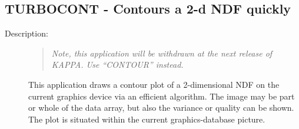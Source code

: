 \documentclass[twoside,11pt]{article}
\newcommand{\stardocinitials}  {SUN}
\newcommand{\stardocnumber}    {239.2}
\newcommand{\stardocname}{\stardocinitials /\stardocnumber}
\newcommand{\xlabel}[1]{}
\newlength{\sstbannerlength}
\newlength{\sstcaptionlength}
\newlength{\sstexampleslength}
\newlength{\sstexampleswidth}
\newcommand{\sstroutine}[3]{
   \goodbreak
   \markboth{{\stardocname}~ --- #1}{{\stardocname}~ --- #1}
   \rule{\textwidth}{0.5mm}
   \vspace{-7ex}
   \newline
   \settowidth{\sstbannerlength}{{\Large {\bf #1}}}
   \setlength{\sstcaptionlength}{\textwidth}
   \setlength{\sstexampleslength}{\textwidth}
   \addtolength{\sstbannerlength}{0.5em}
   \addtolength{\sstcaptionlength}{-2.0\sstbannerlength}
   \addtolength{\sstcaptionlength}{-4.9pt}
   \settowidth{\sstexampleswidth}{{\bf Examples:}}
   \addtolength{\sstexampleslength}{-\sstexampleswidth}
   \parbox[t]{\sstbannerlength}{\flushleft{\Large {\bf #1}}}
   \parbox[t]{\sstcaptionlength}{\center{\Large #2}}
   \parbox[t]{\sstbannerlength}{\flushright{\Large {\bf #1}}}
   \begin{description}
      #3
   \end{description}
}
\newcommand{\sstdescription}[1]{\item[Description:] #1}
\renewcommand{\sstroutine}[3]{
      \subsection{#1\xlabel{#1}-\label{#1}#2}
      \begin{description}
         #3
      \end{description}
   }
\renewcommand{\sstdescription}[1]{\item[Description:]
      \begin{description}
         #1
      \end{description}
   }
\begin{document}
\sstroutine{
   TURBOCONT
}{
   Contours a 2-d NDF quickly
}{
   \sstdescription{

\vspace{5mm}
\begin{quote}
\begin{center}
\emph{ Note, this application will be withdrawn at the next release of
KAPPA. Use ``CONTOUR'' instead.} 
\end{center}
\end{quote}
\vspace{5mm}

      This application draws a contour plot of a 2-dimensional NDF on the
      current graphics device via an efficient algorithm.  The image may be
      part or whole of the data array, but also the variance or quality
      can be shown.  The plot is situated within the current
      graphics-database picture.

}}
\end{document}
